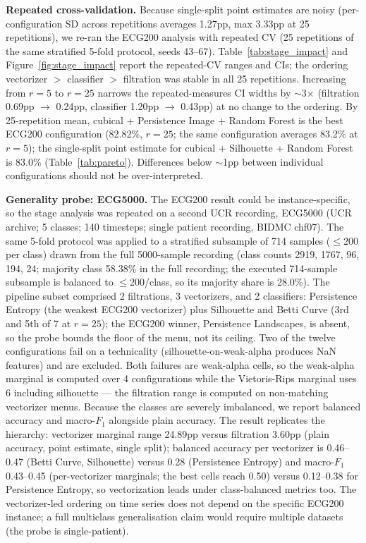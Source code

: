 \documentclass[12pt, a4paper]{report}
\theoremstyle{definition}
\theoremstyle{plain}
\theoremstyle{remark}
\begin{document}
\textbf{Repeated cross-validation.} Because single-split point
estimates are noisy (per-configuration SD across repetitions
averages 1.27pp, max 3.33pp at 25 repetitions), we re-ran the ECG200
analysis with repeated CV (25 repetitions of the same stratified
5-fold protocol, seeds 43--67). Table~\ref{tab:stage_impact}
and Figure~\ref{fig:stage_impact} report the repeated-CV ranges and
CIs; the ordering vectorizer $>$
classifier $>$ filtration was stable in all 25 repetitions.
Increasing from $r{=}5$ to $r{=}25$ narrows the repeated-measures
CI widths by $\sim$3$\times$ (filtration 0.69pp $\to$ 0.24pp,
classifier 1.20pp $\to$ 0.43pp) at no change to the ordering.
By 25-repetition mean, cubical
+ Persistence Image + Random Forest is the best ECG200 configuration
(82.82\%, $r{=}25$; the same configuration averages 83.2\% at
$r{=}5$); the single-split point estimate for cubical +
Silhouette + Random Forest is 83.0\% (Table~\ref{tab:pareto}). Differences below $\sim$1pp between individual
configurations should not be over-interpreted.

\textbf{Generality probe: ECG5000.} The ECG200 result could be instance-specific, so the stage analysis
was repeated on a second UCR recording, ECG5000 (UCR archive; 5 classes; 140 timesteps; single
patient recording, BIDMC chf07). The same 5-fold protocol was applied to a
stratified subsample of 714 samples ($\le 200$ per class) drawn from
the full 5000-sample recording (class counts 2919, 1767, 96, 194,
24; majority class 58.38\% in the full recording; the executed
714-sample subsample is balanced to $\le 200$/class, so its majority
share is 28.0\%). The pipeline subset comprised 2 filtrations,
3 vectorizers, and 2 classifiers: Persistence Entropy (the weakest
ECG200 vectorizer) plus Silhouette and Betti Curve (3rd and 5th of 7
at $r{=}25$); the ECG200 winner, Persistence Landscapes, is absent,
so the probe bounds the floor of the menu, not its ceiling. Two of the
twelve configurations fail on a technicality
(silhouette-on-weak-alpha produces NaN features) and are excluded.
Both failures are weak-alpha cells, so the weak-alpha marginal is
computed over 4 configurations while the Vietoris-Rips marginal uses
6 including silhouette --- the filtration range is computed
on non-matching vectorizer menus.
Because the classes are severely imbalanced, we report balanced
accuracy and macro-$F_1$ alongside plain accuracy. The result
replicates the hierarchy: vectorizer marginal range 24.89pp versus
filtration 3.60pp (plain accuracy, point estimate, single split);
balanced accuracy per vectorizer is 0.46--0.47 (Betti Curve,
Silhouette) versus 0.28 (Persistence Entropy) and macro-$F_1$
0.43--0.45 (per-vectorizer marginals; the best cells reach 0.50)
versus 0.12--0.38 for Persistence Entropy, so vectorization leads
under class-balanced metrics too. The vectorizer-led ordering on time series
does not depend on the specific ECG200 instance; a full
multiclass generalisation claim would require multiple datasets
(the probe is single-patient).
\end{document}
